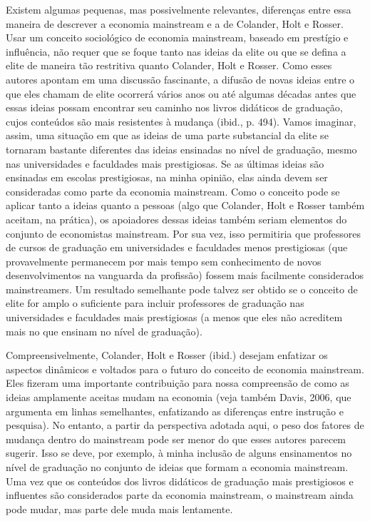 \documentclass[12pt]{article}
\begin{document}
Existem algumas pequenas, mas possivelmente relevantes, diferenças entre essa maneira de descrever a economia mainstream e a de Colander, Holt e Rosser. Usar um conceito sociológico de economia mainstream, baseado em prestígio e influência, não requer que se foque tanto nas ideias da elite ou que se defina a elite de maneira tão restritiva quanto Colander, Holt e Rosser. Como esses autores apontam em uma discussão fascinante, a difusão de novas ideias entre o que eles chamam de elite ocorrerá vários anos ou até algumas décadas antes que essas ideias possam encontrar seu caminho nos livros didáticos de graduação, cujos conteúdos são mais resistentes à mudança (ibid., p. 494). Vamos imaginar, assim, uma situação em que as ideias de uma parte substancial da elite se tornaram bastante diferentes das ideias ensinadas no nível de graduação, mesmo nas universidades e faculdades mais prestigiosas. Se as últimas ideias são ensinadas em escolas prestigiosas, na minha opinião, elas ainda devem ser consideradas como parte da economia mainstream. Como o conceito pode se aplicar tanto a ideias quanto a pessoas (algo que Colander, Holt e Rosser também aceitam, na prática), os apoiadores dessas ideias também seriam elementos do conjunto de economistas mainstream. Por sua vez, isso permitiria que professores de cursos de graduação em universidades e faculdades menos prestigiosas (que provavelmente permanecem por mais tempo sem conhecimento de novos desenvolvimentos na vanguarda da profissão) fossem mais facilmente considerados mainstreamers. Um resultado semelhante pode talvez ser obtido se o conceito de elite for amplo o suficiente para incluir professores de graduação nas universidades e faculdades mais prestigiosas (a menos que eles não acreditem mais no que ensinam no nível de graduação).

Compreensivelmente, Colander, Holt e Rosser (ibid.) desejam enfatizar os aspectos dinâmicos e voltados para o futuro do conceito de economia mainstream. Eles fizeram uma importante contribuição para nossa compreensão de como as ideias amplamente aceitas mudam na economia (veja também Davis, 2006, que argumenta em linhas semelhantes, enfatizando as diferenças entre instrução e pesquisa). No entanto, a partir da perspectiva adotada aqui, o peso dos fatores de mudança dentro do mainstream pode ser menor do que esses autores parecem sugerir. Isso se deve, por exemplo, à minha inclusão de alguns ensinamentos no nível de graduação no conjunto de ideias que formam a economia mainstream. Uma vez que os conteúdos dos livros didáticos de graduação mais prestigiosos e influentes são considerados parte da economia mainstream, o mainstream ainda pode mudar, mas parte dele muda mais lentamente.
\end{document}
